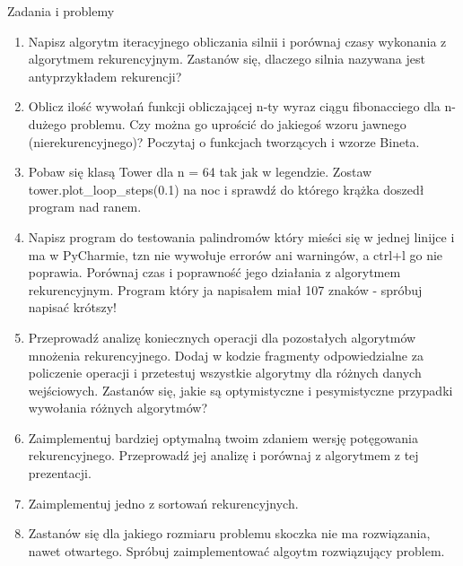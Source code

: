 \begin{frame}[allowframebreaks]{Zadania i problemy}
    \begin{enumerate}
        \item Napisz algorytm iteracyjnego obliczania silnii i porównaj czasy wykonania z algorytmem rekurencyjnym. Zastanów się, dlaczego silnia nazywana jest antyprzykładem rekurencji? \\
        \item Oblicz ilość wywołań funkcji obliczającej n-ty wyraz ciągu fibonacciego dla n-dużego problemu. Czy można go uprościć do jakiegoś wzoru jawnego (nierekurencyjnego)? Poczytaj o funkcjach tworzących i wzorze Bineta. \\
        \item Pobaw się klasą Tower dla n = 64 tak jak w legendzie. Zostaw tower.plot_loop_steps(0.1) na noc i sprawdź do którego krążka doszedł program nad ranem. \\
        \item Napisz program do testowania palindromów który mieści się w jednej linijce i ma \textcolor{green}{\checkmark} w PyCharmie, tzn nie wywołuje errorów ani warningów, a ctrl+l go nie poprawia. Porównaj czas i poprawność jego działania z algorytmem rekurencyjnym. Program który ja napisałem miał 107 znaków - spróbuj napisać krótszy! \\
        \item Przeprowadź analizę koniecznych operacji dla pozostałych algorytmów mnożenia rekurencyjnego. Dodaj w kodzie fragmenty odpowiedzialne za policzenie operacji i przetestuj wszystkie algorytmy dla różnych danych wejściowych. Zastanów się, jakie są optymistyczne i pesymistyczne przypadki wywołania różnych algorytmów? \\
        \item Zaimplementuj bardziej optymalną twoim zdaniem wersję potęgowania rekurencyjnego. Przeprowadź jej analizę i porównaj z algorytmem z tej prezentacji. \\
        \item Zaimplementuj jedno z sortowań rekurencyjnych. \\
        \item Zastanów się dla jakiego rozmiaru problemu skoczka nie ma rozwiązania, nawet otwartego. Spróbuj zaimplementować algoytm rozwiązujący problem. \\
    \end{enumerate}
\end{frame}